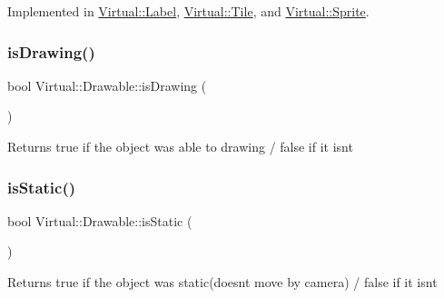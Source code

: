 Implemented in \hyperlink{class_virtual_1_1_label_aaea754974570ba425d2b9ffe91d183c7}{Virtual\+::\+Label}, \hyperlink{class_virtual_1_1_tile_ac9adb75122a87ec5efb5107b611ba226}{Virtual\+::\+Tile}, and \hyperlink{class_virtual_1_1_sprite_a57f581e0307ab2b2dd7c6922dba2a057}{Virtual\+::\+Sprite}.

\hypertarget{class_virtual_1_1_drawable_a47902855528332fd79595db7dacca2ed}{}\label{class_virtual_1_1_drawable_a47902855528332fd79595db7dacca2ed} 
\subsubsection{\texorpdfstring{is\+Drawing()}{isDrawing()}}
{\footnotesize\ttfamily bool Virtual\+::\+Drawable\+::is\+Drawing (\begin{DoxyParamCaption}{ }\end{DoxyParamCaption})}

\begin{DoxyReturn}{Returns}
true if the object was able to drawing / false if it isn\textquotesingle{}t 
\end{DoxyReturn}
\hypertarget{class_virtual_1_1_drawable_a7901d5ac8f7ebed5e3d5773c9699ca7c}{}\label{class_virtual_1_1_drawable_a7901d5ac8f7ebed5e3d5773c9699ca7c} 
\subsubsection{\texorpdfstring{is\+Static()}{isStatic()}}
{\footnotesize\ttfamily bool Virtual\+::\+Drawable\+::is\+Static (\begin{DoxyParamCaption}{ }\end{DoxyParamCaption})}

\begin{DoxyReturn}{Returns}
true if the object was static(doesn\textquotesingle{}t move by camera) / false if it isn\textquotesingle{}t 
\end{DoxyReturn}
\hypertarget{class_virtual_1_1_drawable_af47ef44ac82ef8f11873fcf3e7a4aaa0}{}\label{class_virtual_1_1_drawable_af47ef44ac82ef8f11873fcf3e7a4aaa0} 
